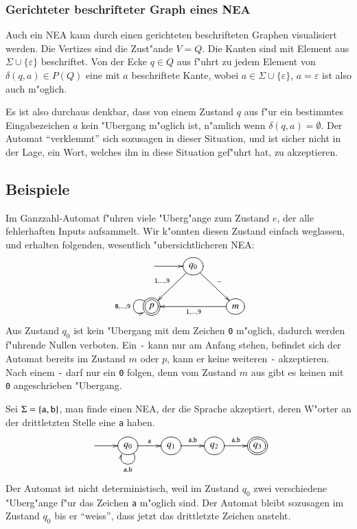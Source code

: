 \subsubsection{Gerichteter beschrifteter Graph eines NEA}
Auch ein NEA kann durch einen gerichteten beschrifteten Graphen
visualisiert werden. Die Vertizes sind die Zust"ande $V=Q$. Die
Kanten sind mit Element aus $\Sigma\cup\{\varepsilon\}$ beschriftet.
Von der Ecke $q\in Q$ aus f"uhrt zu jedem Element von $\delta(q,a)\in P(Q)$
eine mit $a$ beschriftete Kante, wobei $a\in \Sigma\cup\{\varepsilon\}$, $a=\varepsilon$ ist also auch m"oglich.

Es ist also durchaus denkbar, dass von einem Zustand $q$ aus f"ur ein
bestimmtes Eingabezeichen $a$ kein "Ubergang m"oglich ist, n"amlich
wenn $\delta(q,a)=\emptyset$. Der Automat ``verklemmt'' sich sozusagen
in dieser Situation, und ist sicher nicht in der Lage, ein Wort, welches
ihn in diese Situation gef"uhrt hat, zu akzeptieren.


\subsection{Beispiele}
\begin{beispiel}
Im Ganzzahl-Automat f"uhren viele "Uberg"ange zum Zustand $e$, der
alle fehlerhaften Inputs aufsammelt. Wir k"onnten diesen Zustand einfach
weglassen, und erhalten folgenden, wesentlich "ubersichtlicheren NEA:
\[
\entrymodifiers={++[o][F]}
\xymatrix{
*+\txt{}\ar[r]
	&{q_0}  \ar[dl]_{{\tt 1},\dots,{\tt 9}} \ar[dr]^{\tt -}
\\
*++[o][F=]{p}\ar@(ul,dl)_{{\tt 0},\dots,{\tt 9}}
	&*+\txt{}
		&{m} \ar[ll]^{{\tt 1},\dots,{\tt 9}}
}
\]
Aus Zustand $q_0$ ist kein "Ubergang mit dem Zeichen {\tt 0} m"oglich,
dadurch werden f"uhrende Nullen verboten.
Ein {\tt -} kann nur am Anfang
stehen, befindet sich der Automat bereits im Zustand $m$ oder $p$, kann 
er keine weiteren {\tt -} akzeptieren.
Nach einem {\tt -} darf nur ein {\tt 0} folgen, denn vom Zustand $m$
aus gibt es keinen mit {\tt 0} angeschrieben "Ubergang.
\end{beispiel}

\begin{beispiel}
Sei $\Sigma=\{{\tt a},{\tt b}\}$, man finde einen NEA, der die 
Sprache akzeptiert, deren W"orter an der drittletzten Stelle
eine {\tt a} haben.
\[
\entrymodifiers={++[o][F]}
\xymatrix{
*+\txt{} \ar[r]
	&{q_0} \ar[r]^{\tt a} \ar@(dr,dl)^{{\tt a},{\tt b}}
		&{q_1}\ar[r]^{{\tt a},{\tt b}}
			&{q_2}\ar[r]^{{\tt a},{\tt b}}
				&*++[o][F=]{q_3}
}
\]
Der Automat ist nicht deterministisch, weil im Zustand $q_0$ zwei verschiedene
"Uberg"ange f"ur das Zeichen {\tt a} m"oglich sind. Der Automat bleibt
sozusagen im Zustand $q_0$ bis er ``weiss'', dass jetzt das drittletzte
Zeichen ansteht.
\end{beispiel}

